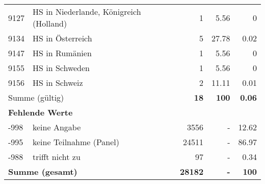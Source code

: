 \begin{longtable}{lXrrr}
     9127 &
     \multicolumn{1}{X}{ HS in Niederlande, Königreich (Holland)   } &


       \num{1} &
       \num[round-mode=places,round-precision=2]{5.56} &
         \num[round-mode=places,round-precision=2]{0} \\

     9134 &
     \multicolumn{1}{X}{ HS in Österreich   } &


       \num{5} &
       \num[round-mode=places,round-precision=2]{27.78} &
         \num[round-mode=places,round-precision=2]{0.02} \\

     9147 &
     \multicolumn{1}{X}{ HS in Rumänien   } &


       \num{1} &
       \num[round-mode=places,round-precision=2]{5.56} &
         \num[round-mode=places,round-precision=2]{0} \\

     9155 &
     \multicolumn{1}{X}{ HS in Schweden   } &


       \num{1} &
       \num[round-mode=places,round-precision=2]{5.56} &
         \num[round-mode=places,round-precision=2]{0} \\

     9156 &
     \multicolumn{1}{X}{ HS in Schweiz   } &


       \num{2} &
       \num[round-mode=places,round-precision=2]{11.11} &
         \num[round-mode=places,round-precision=2]{0.01} \\
     \midrule
     \multicolumn{2}{l}{Summe (gültig)} &
       \textbf{\num{18}} &
     \textbf{100} &
       \textbf{\num[round-mode=places,round-precision=2]{0.06}} \\
     \multicolumn{5}{l}{\textbf{Fehlende Werte}}\\
       -998 &
       keine Angabe &
         \num{3556} &
        - &
         \num[round-mode=places,round-precision=2]{12.62} \\
       -995 &
       keine Teilnahme (Panel) &
         \num{24511} &
        - &
         \num[round-mode=places,round-precision=2]{86.97} \\
       -988 &
       trifft nicht zu &
         \num{97} &
        - &
         \num[round-mode=places,round-precision=2]{0.34} \\
     \midrule
     \multicolumn{2}{l}{\textbf{Summe (gesamt)}} &
          \textbf{\num{28182}} &
        \textbf{-} &
        \textbf{100} \\
     \bottomrule
     \end{longtable}
     
